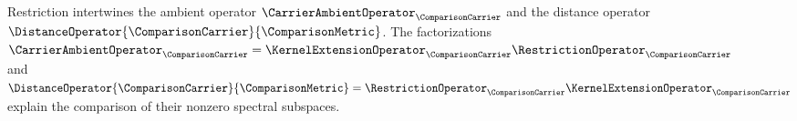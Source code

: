 \begin{figure}[H]
\centering
{}
\caption{Restriction intertwines the ambient operator
$\CarrierAmbientOperator_\ComparisonCarrier$
and the distance operator
$\DistanceOperator{\ComparisonCarrier}{\ComparisonMetric}$.
The factorizations
$\CarrierAmbientOperator_\ComparisonCarrier=\KernelExtensionOperator_\ComparisonCarrier\RestrictionOperator_\ComparisonCarrier$
and
$\DistanceOperator{\ComparisonCarrier}{\ComparisonMetric}=\RestrictionOperator_\ComparisonCarrier\KernelExtensionOperator_\ComparisonCarrier$
explain the comparison of their nonzero spectral subspaces.}
\label{fig:operator-comparison}
\end{figure}
